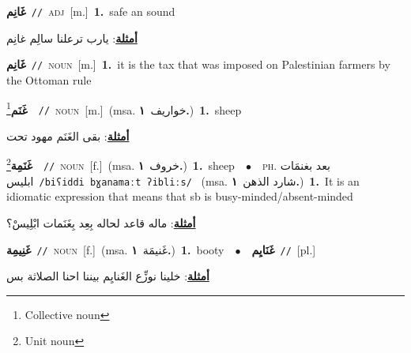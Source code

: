 \documentclass[10pt,a4paper,twoside]{article} %
\begin{document}
\begin{multicols}{2}
{\setlength\topsep{0pt}\textbf{\foreignlanguage{arabic}{غَانِم}}\ {\color{gray}\texttt{//}\color{black}}\ \textsc{adj}\ [m.]\ \textbf{1.}~safe an sound\  \begin{flushright}\color{gray}\foreignlanguage{arabic}{\textbf{\underline{\foreignlanguage{arabic}{أمثلة}}}: يارب ترعلنا سالِم غانِم}\end{flushright}\color{black}} \vspace{2mm}

{\setlength\topsep{0pt}\textbf{\foreignlanguage{arabic}{غَانِم}}\ {\color{gray}\texttt{//}\color{black}}\ \textsc{noun}\ [m.]\ \textbf{1.}~it is the tax that was imposed on Palestinian farmers by the Ottoman rule\ } \vspace{2mm}

{\setlength\topsep{0pt}\textbf{\foreignlanguage{arabic}{غَنَم}}\footnote{Collective noun}\ \ {\color{gray}\texttt{//}\color{black}}\ \textsc{noun}\ [m.]\ \color{gray}(msa. \foreignlanguage{arabic}{خواريف}~\foreignlanguage{arabic}{\textbf{١.}})\color{black}\ \textbf{1.}~sheep\  \begin{flushright}\color{gray}\foreignlanguage{arabic}{\textbf{\underline{\foreignlanguage{arabic}{أمثلة}}}: بقى الغَنَم مهود تحت}\end{flushright}\color{black}} \vspace{2mm}

{\setlength\topsep{0pt}\textbf{\foreignlanguage{arabic}{غَنَمِة}}\footnote{Unit noun}\ \ {\color{gray}\texttt{//}\color{black}}\ \textsc{noun}\ [f.]\ \color{gray}(msa. \foreignlanguage{arabic}{خروف}~\foreignlanguage{arabic}{\textbf{١.}})\color{black}\ \textbf{1.}~sheep\ \ $\bullet$\ \ \textsc{ph.} \color{gray} \foreignlanguage{arabic}{بعد بغنمَات ابليس}\color{black}\ {\color{gray}\texttt{/{\sffamily biʕiddi bɣanamaːt ʔibliːs}/}\color{black}}\ \color{gray} (msa. \foreignlanguage{arabic}{شارد الذهن}~\foreignlanguage{arabic}{\textbf{١.}})\color{black}\ \textbf{1.}~It is an idiomatic expression that means that sb is busy-minded/absent-minded\  \begin{flushright}\color{gray}\foreignlanguage{arabic}{\textbf{\underline{\foreignlanguage{arabic}{أمثلة}}}: ماله قاعد لحاله بِعِد بِغَنَمات ابْلِيسْ؟}\end{flushright}\color{black}} \vspace{2mm}

{\setlength\topsep{0pt}\textbf{\foreignlanguage{arabic}{غَنِيمِة}}\ {\color{gray}\texttt{//}\color{black}}\ \textsc{noun}\ [f.]\ \color{gray}(msa. \foreignlanguage{arabic}{غَنيمَة}~\foreignlanguage{arabic}{\textbf{١.}})\color{black}\ \textbf{1.}~booty\ \ $\bullet$\ \ \setlength\topsep{0pt}\textbf{\foreignlanguage{arabic}{غَنَايِم}}\ {\color{gray}\texttt{//}\color{black}}\ [pl.]\  \begin{flushright}\color{gray}\foreignlanguage{arabic}{\textbf{\underline{\foreignlanguage{arabic}{أمثلة}}}: خلينا نوزِّع الغَنايِم بيننا احنا الصلاثة بس}\end{flushright}\color{black}} \vspace{2mm}


\end{multicols}
\end{document}
